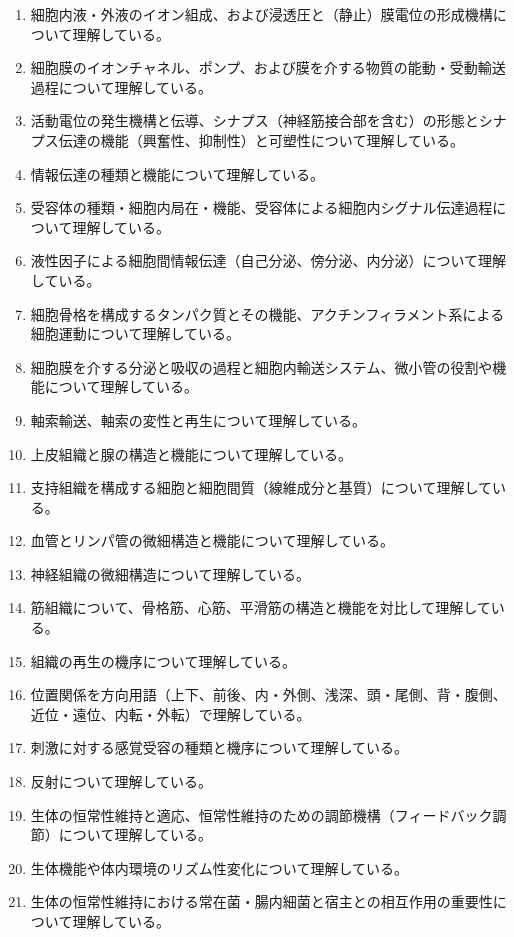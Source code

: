 \begin{enumerate}
\def\labelenumi{\arabic{enumi}.}
\tightlist
\item
  細胞内液・外液のイオン組成、および浸透圧と（静止）膜電位の形成機構について理解している。
\item
  細胞膜のイオンチャネル、ポンプ、および膜を介する物質の能動・受動輸送過程について理解している。
\item
  活動電位の発生機構と伝導、シナプス（神経筋接合部を含む）の形態とシナプス伝達の機能（興奮性、抑制性）と可塑性について理解している。
\item
  情報伝達の種類と機能について理解している。
\item
  受容体の種類・細胞内局在・機能、受容体による細胞内シグナル伝達過程について理解している。
\item
  液性因子による細胞間情報伝達（自己分泌、傍分泌、内分泌）について理解している。
\item
  細胞骨格を構成するタンパク質とその機能、アクチンフィラメント系による細胞運動について理解している。
\item
  細胞膜を介する分泌と吸収の過程と細胞内輸送システム、微小管の役割や機能について理解している。
\item
  軸索輸送、軸索の変性と再生について理解している。
\item
  上皮組織と腺の構造と機能について理解している。
\item
  支持組織を構成する細胞と細胞間質（線維成分と基質）について理解している。
\item
  血管とリンパ管の微細構造と機能について理解している。
\item
  神経組織の微細構造について理解している。
\item
  筋組織について、骨格筋、心筋、平滑筋の構造と機能を対比して理解している。
\item
  組織の再生の機序について理解している。
\item
  位置関係を方向用語（上下、前後、内・外側、浅深、頭・尾側、背・腹側、近位・遠位、内転・外転）で理解している。
\item
  刺激に対する感覚受容の種類と機序について理解している。
\item
  反射について理解している。
\item
  生体の恒常性維持と適応、恒常性維持のための調節機構（フィードバック調節）について理解している。
\item
  生体機能や体内環境のリズム性変化について理解している。
\item
  生体の恒常性維持における常在菌・腸内細菌と宿主との相互作用の重要性について理解している。

\end{enumerate}
